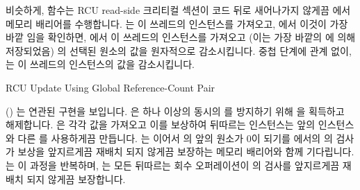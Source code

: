 \fi

\begin{fcvref}
비슷하게,  함수는 RCU read-side 크리티컬 섹션이
 코드 뒤로 새어나가지 않게끔  에서 메모리
배리어를 수행합니다.
 는 이 쓰레드의  인스턴스를 가져오고, 
에서 이것이 가장 바깥  임을 확인하면, 
에서 이 쓰레드의  인스턴스를 가져오고 (이는 가장 바깥의
 에 의해 저장되었음)  의 선택된 원소의 값을
원자적으로 감소시킵니다.
중첩 단계에 관계 없이,  는 이 쓰레드의 
인스턴스의 값을 감소시킵니다.
\end{fcvref}

\iffalse

\begin{fcvref}[ln:defer:rcu_rcpg:r:unlock]
Similarly, the \co{rcu_read_unlock()} function executes a memory barrier
at \clnref{mb}
to ensure that the RCU read-side critical section does not bleed out
after the \co{rcu_read_unlock()} code.
\Clnref{nest} picks up this thread's instance of \co{rcu_nesting}, and if
\clnref{if} finds that this is the outermost \co{rcu_read_unlock()},
then \clnref{idx,atmdec} pick up this thread's instance of \co{rcu_read_idx}
(saved by the outermost \co{rcu_read_lock()}) and atomically decrements
the selected element of \co{rcu_refcnt}.
Regardless of the nesting level, \clnref{decnest} decrements this thread's
instance of \co{rcu_nesting}.
\end{fcvref}

\fi

\begin{listing}[tbp]

\caption{RCU Update Using Global Reference-Count Pair}
\label{lst:app:toyrcu:RCU Update Using Global Reference-Count Pair}
\end{listing}

\begin{fcvref}
()
는 연관된  구현을 보입니다.
 은 하나 이상의 동시의  를 방지하기 위해
 을 획득하고 해제합니다.
 은 각각  값을 가져오고 이를 보상하여 뒤따르는
 인스턴스는 앞의 인스턴스와 다른  를
사용하게끔 만듭니다.
 는 이어서  의 앞의 원소가 0이
되기를  에서의  의 검사가  보상을
앞지르게끔 재배치 되지 않게끔 보장하는 메모리 배리어와 함께 기다립니다.
 는 이 과정을 반복하며,  는 모든
뒤따르는 회수 오퍼레이션이  의 검사를 앞지르게끔 재배치 되지
않게끔 보장합니다.
\end{fcvref}


